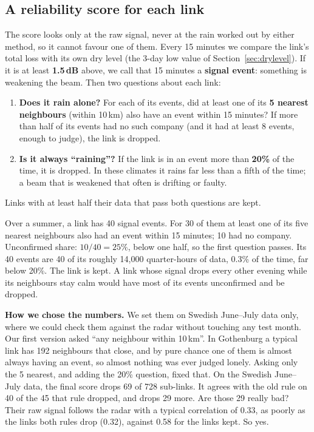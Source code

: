\subsection{A reliability score for each link}
\label{sec:reliability}
The score looks only at the raw signal, never at the rain worked out by either method, so it cannot favour one of them.
Every 15 minutes we compare the link's total loss with its own dry level (the 3-day low value of
Section~\ref{sec:drylevel}). If it is at least \textbf{1.5\,dB} above, we call that 15 minutes a \textbf{signal event}:
something is weakening the beam. Then two questions about each link:
\begin{enumerate}
\item \textbf{Does it rain alone?} For each of its events, did at least one of its \textbf{5 nearest neighbours} (within
10\,km) also have an event within 15 minutes? If more than half of its events had no such company (and it had at least 8
events, enough to judge), the link is dropped.
\item \textbf{Is it always ``raining''?} If the link is in an event more than \textbf{20\%} of the time, it is dropped. In
these climates it rains far less than a fifth of the time; a beam that is weakened that often is drifting or faulty.
\end{enumerate}
Links with at least half their data that pass both questions are kept.

\begin{example}
Over a summer, a link has 40 signal events. For 30 of them at least one of its five nearest neighbours also had an event
within 15 minutes; 10 had no company. Unconfirmed share: $10/40 = 25\%$, below one half, so the first question passes. Its
40 events are 40 of its roughly 14{,}000 quarter-hours of data, 0.3\% of the time, far below 20\%. The link is kept. A link
whose signal drops every other evening while its neighbours stay calm would have most of its events unconfirmed and be
dropped.
\end{example}

\textbf{How we chose the numbers.} We set them on Swedish June--July data only, where we could check them against the radar
without touching any test month. Our first version asked ``any neighbour within 10\,km''. In Gothenburg a typical link has
192 neighbours that close, and by pure chance one of them is almost always having an event, so almost nothing was ever
judged lonely. Asking only the 5 nearest, and adding the 20\% question, fixed that. On the Swedish June--July data, the
final score drops 69 of 728 sub-links. It agrees with the old rule on 40 of the 45 that rule dropped, and drops 29 more.
Are those 29 really bad? Their raw signal follows the radar with a typical correlation of 0.33, as poorly as the links
both rules drop (0.32), against 0.58 for the links kept. So yes.

